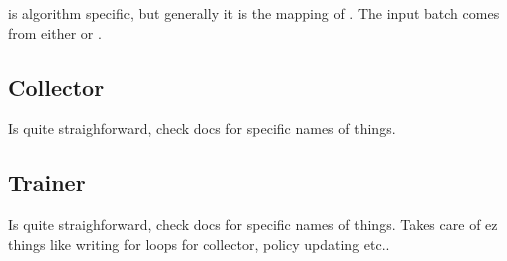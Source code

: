 \documentclass{article}
\begin{document}
 is algorithm specific, but generally it is the mapping
of .
The input batch comes from either  or .

\subsection{Collector}
Is quite straighforward, check docs for specific names of things.

\subsection{Trainer}
Is quite straighforward, check docs for specific names of things.
Takes care of ez things like writing for loops for collector, policy updating etc..
\end{document}
